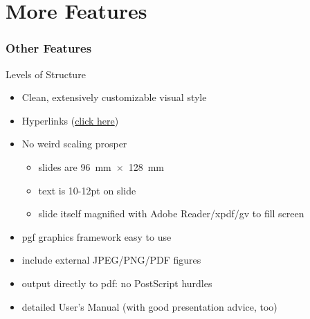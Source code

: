 \documentclass[aspectratio=169,handout]{beamer}
\begin{document}
    \section{More Features}

    \begin{frame}
        \frametitle{Other Features}

        \begin{block}{Levels of Structure}
            \begin{itemize}
                \item Clean, extensively customizable visual style
                \item Hyperlinks (\href{http://github.com/izahn/iqss-beamer-theme}{click here})
                \item No weird scaling prosper
                \begin{itemize}
                    \item slides are 96~mm~$\times$~128~mm

                    \item text is 10-12pt on slide

                    \item slide itself magnified with Adobe Reader/xpdf/gv to fill screen
                \end{itemize}

                \item pgf graphics framework easy to use

                \item include external JPEG/PNG/PDF figures

                \item output directly to pdf: no PostScript hurdles

                \item detailed User's Manual (with good presentation advice, too)
            \end{itemize}
        \end{block}
    \end{frame}
\end{document}
